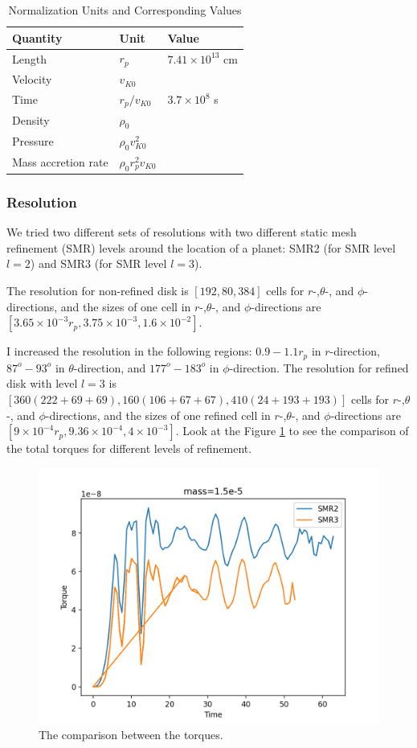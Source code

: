 \documentclass[twocolumn]{aastex631}
\begin{document}
\begin{table}[]
    \label{tab:units}
    \caption{Normalization Units and Corresponding Values}
    \begin{tabular}{lll}
    \hline \hline
    Quantity            & Unit                  & Value                   \\ \hline
    Length              & $r_p$                 & $7.41\times 10^{13}$ cm \\
    Velocity            & $v_{K0}$              &                         \\
    Time                & $r_p/v_{K0}$          & $3.7 \times 10^8$ s     \\
    Density             & $\rho_0$              &                         \\
    Pressure            & $\rho_0 v_{K0}^2$     &                         \\
    Mass accretion rate & $\rho_0 r_p^2 v_{K0}$ &                         \\ \hline
    \end{tabular}
\end{table}
%
\subsubsection{Resolution}
We tried two different sets of resolutions with two different static mesh refinement (SMR) levels around the location of a planet: SMR2 (for SMR level $l=2$) and SMR3 (for SMR level $l=3$).

The resolution for non-refined disk is $[192,80,384]$ cells for $r$-,$\theta$-, and $\phi$-directions, and the sizes of one cell in $r$-,$\theta$-, and $\phi$-directions are $[3.65\times 10^{-3}r_p, 3.75\times 10^{-3}, 1.6\times 10^{-2}]$. 

I increased the resolution in the following regions: $0.9-1.1 r_p$ in $r$-direction, $87^o-93^o$ in $\theta$-direction, and $177^o-183^o$ in $\phi$-direction. The resolution for refined disk with level $l=3$ is $[360 (222+69+69),160 (106+67+67),410 (24+193+193)]$ cells for $r$-,$\theta$-, and $\phi$-directions, and the sizes of one refined cell in $r$-,$\theta$-, and $\phi$-directions are $[9\times 10^{-4}r_p, 9.36\times 10^{-4}, 4\times 10^{-3}]$.
Look at the Figure \ref{fig:twotorques} to see the comparison of the total torques for different levels of refinement.
\begin{figure}
\centering
	\includegraphics[width=0.6\columnwidth]{comparison_torques.png}
    \caption{The comparison between the torques.}
    \label{fig:twotorques}
\end{figure}
\end{document}
